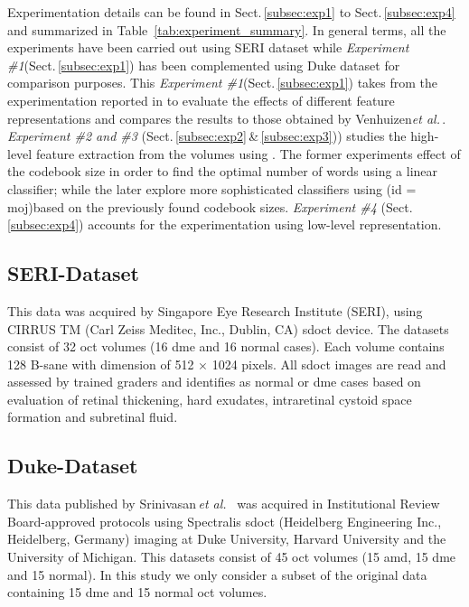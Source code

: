 Experimentation details can be found in Sect.\,\ref{subsec:exp1} to Sect.\,\ref{subsec:exp4} and summarized in Table~\ref{tab:experiment_summary}.
In general terms, all the experiments have been carried out using SERI dataset while \emph{Experiment \#1}(Sect.\,\ref{subsec:exp1}) has been complemented using Duke dataset for comparison purposes. This \emph{Experiment \#1}(Sect.\,\ref{subsec:exp1}) takes from the experimentation reported in \cite{Lemaintre2015miccaiOCT} to evaluate the effects of different feature representations and compares the results to those obtained by Venhuizen\emph{et al.}\,\cite{Venhuizen2015}.
\emph{Experiment \#2 and \#3} (Sect.\,\ref{subsec:exp2}\,\&\,\ref{subsec:exp3})) studies the high-level feature extraction from the volumes using \bow. The former experiments effect of the codebook size in order to find the optimal number of words using a linear classifier; while the later explore more sophisticated classifiers using \added(id = moj){based on} the previously found codebook sizes.
\emph{Experiment \#4} (Sect.\,\ref{subsec:exp4}) accounts for the experimentation using low-level representation.



\subsection{SERI-Dataset}\label{sec:exp:dataset:seri}
This data was acquired by Singapore Eye Research Institute (SERI), using CIRRUS TM (Carl Zeiss Meditec, Inc., Dublin, CA) \ac{sdoct} device. The datasets consist of 32 \ac{oct} volumes (16 \ac{dme} and 16 normal cases). Each volume contains 128 B-sane with  dimension of 512 $\times$ 1024 pixels.  All \ac{sdoct} images are read and assessed by trained graders and identifies as normal or \ac{dme} cases based on evaluation of retinal thickening, hard exudates, intraretinal cystoid space formation and subretinal fluid.

\subsection{Duke-Dataset} \label{sec:exp:dataset:duke}
This data published by Srinivasan\,\emph{et al.}~\cite{Srinivasan2014} was acquired in Institutional Review Board-approved protocols using Spectralis \ac{sdoct} (Heidelberg Engineering Inc., Heidelberg, Germany) imaging at Duke University, Harvard University and the University of Michigan. This datasets consist of 45 \ac{oct} volumes (15 \ac{amd}, 15 \ac{dme} and 15 normal). In this study we only consider a subset of the original data containing 15 \ac{dme} and 15 normal \ac{oct} volumes.


